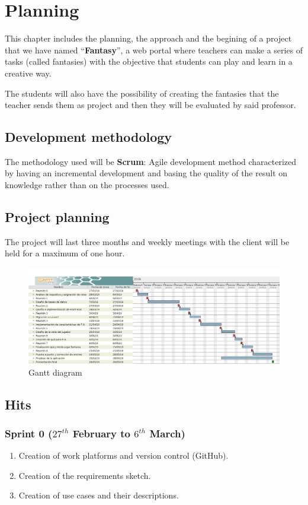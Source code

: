 \chapter{Planning}
This chapter includes the planning, the approach and the begining of a project that we have named ``\textbf{Fantasy}'', a web portal where teachers can make a series of tasks (called fantasies) with the objective that students can play and learn in a creative way.

The students will also have the possibility of creating the fantasies that the teacher sends them as project and then they will be evaluated by said professor.

\section{Development methodology}
The methodology used will be \textbf{Scrum}: Agile development method characterized by having an incremental development and basing the quality of the result on knowledge rather than on the processes used.

\section{Project planning}
The project will last three months and weekly meetings with the client will be held for a maximum of one hour.
\newpage
\begin{figure}[h]
	\centering
	\includegraphics[scale=0.35]{Fantasy.png}
	\caption{Gantt diagram}
	\label{Gantt diagram}
\end{figure}

\section{Hits} %
\subsection{Sprint 0 ($27^{th}$ February to $6^{th}$ March)}
\begin{enumerate}
	\item Creation of work platforms and version control (GitHub).
	\item Creation of the requirements sketch.
	\item Creation of use cases and their descriptions.
\end{enumerate}
